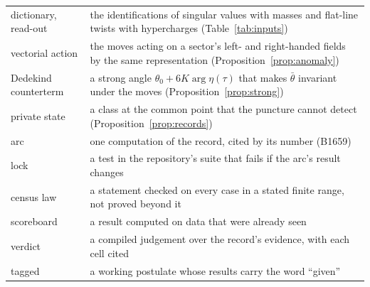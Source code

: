 {\begin{longtable}{@{}p{3.4cm}p{12.0cm}@{}}
dictionary, read-out & the identifications of singular values with masses and flat-line twists with hypercharges (Table~\ref{tab:inputs}) \\
vectorial action & the moves acting on a sector's left- and right-handed fields by the same representation (Proposition~\ref{prop:anomaly}) \\
Dedekind counterterm & a strong angle $\theta_0+6K\arg\eta(\tau)$ that makes $\bar\theta$ invariant under the moves (Proposition~\ref{prop:strong}) \\
private state & a class at the common point that the puncture cannot detect (Proposition~\ref{prop:records}) \\
arc & one computation of the record, cited by its number (B1659) \\
lock & a test in the repository's suite that fails if the arc's result changes \\
census law & a statement checked on every case in a stated finite range, not proved beyond it \\
scoreboard & a result computed on data that were already seen \\
verdict & a compiled judgement over the record's evidence, with each cell cited \\
tagged & a working postulate whose results carry the word ``given'' \\
\end{longtable}}
